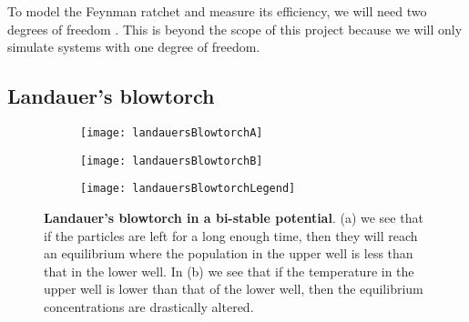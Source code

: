 To model the Feynman ratchet and measure its efficiency, we will need two degrees of freedom \cite{M.W.Jack2016}. This is beyond the scope of this project because we will only simulate systems with one degree of freedom.

\subsection{Landauer's blowtorch} \label{landauersBlowtorch}
\begin{figure}[tb]
	\begin{subfigure}{0.42\textwidth}
		\texttt{[image: landauersBlowtorchA]}
		\caption{\label{fig:landauerA}}
	\end{subfigure}
	\begin{subfigure}{0.42\textwidth}
		\texttt{[image: landauersBlowtorchB]}
		\caption{\label{fig:landauerB}}
	\end{subfigure}
	\begin{subfigure}{0.12\textwidth}
		\texttt{[image: landauersBlowtorchLegend]}
	\end{subfigure}

\caption{\textbf{Landauer's blowtorch in a bi-stable potential}. (a) we see that if the particles are left for a long enough time, then they will reach an equilibrium where the population in the upper well is less than that in the lower well. In (b) we see that if the temperature in the upper well is lower than that of the lower well, then the equilibrium concentrations are drastically altered.}
\label{fig:landauersBlowtorch}
\end{figure}
